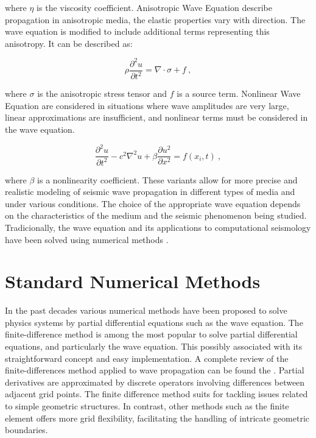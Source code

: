 \documentclass[11pt,twoside]{article}
\begin{document}
where $\eta$ is the viscosity coefficient. Anisotropic Wave Equation describe propagation in anisotropic media, 
the elastic properties vary with direction. The wave equation is modified to include additional terms representing 
this anisotropy. It can be described as:

\begin{equation*}
\rho \frac{\partial^2 u}{\partial t^2} = \nabla \cdot \sigma + f \ ,
\label{anisotropic}
\end{equation*}
    
where $\sigma$ is the anisotropic stress tensor and $f$ is a source term. Nonlinear Wave Equation are considered 
in situations where wave amplitudes are very large, linear approximations are insufficient, and nonlinear terms 
must be considered in the wave equation.

\begin{equation*}
\frac{\partial^2 u}{\partial t^2} - c^2 \nabla^2 u + \beta \frac{\partial u^2}{\partial x^2} = f(x_i, t) \ ,
\label{nonlinear}
\end{equation*}
    
where $\beta$ is a nonlinearity coefficient. These variants allow for more precise and realistic modeling 
of seismic wave propagation in different types of media and under various conditions. The choice of the 
appropriate wave equation depends on the characteristics of the medium and the seismic phenomenon being studied. 
Tradicionally, the wave equation and its applications to computational seismology have been solved using 
numerical methods \citep{Igel2017}.

\section{Standard Numerical Methods}\label{sec:standard_numerical_methods}

In the past decades various numerical methods have been proposed to solve physics systems by partial differential 
equations such as the wave equation. The finite-difference method is among the most 
popular to solve partial differential equations, and particularly the wave equation. This possibly associated with 
its straightforward concept and easy implementation. A complete review of the finite-differences method applied to 
wave propagation can be found the . Partial derivatives are approximated by discrete operators 
involving differences between adjacent grid points. The finite difference method suits for tackling issues related to 
simple geometric structures. In contrast, other methods such as the finite element offers more grid flexibility, 
facilitating the handling of intricate geometric boundaries.
\end{document}

